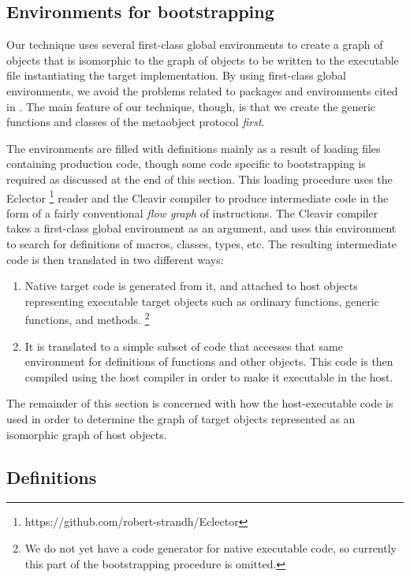 \subsection{Environments for bootstrapping}

Our technique uses several first-class global environments
\cite{Strandh:2015:ELS:Environments} to create a graph of objects that
is isomorphic to the graph of objects to be written to the executable
file instantiating the target \commonlisp{} implementation.  By using
first-class global environments, we avoid the problems related to
packages and environments cited in .  The main
feature of our technique, though, is that we create the generic
functions and classes of the metaobject protocol \emph{first}.

The environments are filled with definitions mainly as a result of
loading files containing production \sicl{} code, though some code
specific to bootstrapping is required as discussed at the end of this
section.  This loading procedure uses the Eclector%
\footnote{https://github.com/robert-strandh/Eclector}
reader and the Cleavir compiler to produce intermediate code in the
form of a fairly conventional \emph{flow graph} of instructions.  The
Cleavir compiler takes a first-class global environment as an
argument, and uses this environment to search for definitions of
macros, classes, types, etc.  The resulting intermediate code is then
translated in two different ways:

\begin{enumerate}
\item Native target code is generated from it, and attached to host
  objects representing executable target objects such as ordinary
  functions, generic functions, and methods.%
  \footnote{We do not yet have a code generator for native executable
    code, so currently this part of the bootstrapping procedure is
    omitted.}
\item It is translated to a simple subset of \commonlisp{} code that
  accesses that same environment for definitions of functions and
  other objects.  This \commonlisp{} code is then compiled using the
  host compiler in order to make it executable in the host.
\end{enumerate}

The remainder of this section is concerned with how the
host-executable code is used in order to determine the graph of target
objects represented as an isomorphic graph of host objects.

\subsection{Definitions}

